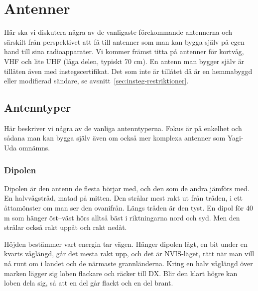 \chapter{Antenner}
\label{sec:antenner}

Här ska vi diskutera några av de vanligaste förekommande antennerna
och särskilt från perspektivet att få till antenner som man kan bygga
själv på egen hand till sina radioapparater. Vi kommer främst titta på
antenner för kortvåg, VHF och lite UHF (låga delen, typiskt 70 cm).
En antenn man bygger själv är tillåten även med instegscertifikat.
Det som inte är tillåtet då är en hemmabyggd eller modifierad sändare,
se avsnitt~\ref{sec:insteg-restriktioner}.

\vfill
\minitoc
\clearpage

\section{Antenntyper}

Här beskriver vi några av de vanliga antenntyperna. Fokus är på
enkelhet och sådana man kan bygga själv även om också mer komplexa
antenner som Yagi-Uda omnämns.

\subsection{Dipolen}

Dipolen är den antenn de flesta börjar med, och den som de andra
jämförs med. En halvvågstråd, matad på mitten. Den strålar mest rakt
ut från tråden, i ett åttamönster om man ser den ovanifrån. Längs
tråden är den tyst. En dipol för 40\,m som hänger öst--väst hörs
alltså bäst i riktningarna nord och syd. Men den strålar också rakt
uppåt och rakt nedåt.

Höjden bestämmer vart energin tar vägen. Hänger dipolen lågt, en bit
under en kvarts våglängd, går det mesta rakt upp, och det är
NVIS-läget, rätt när man vill nå runt om i landet och de närmaste
grannländerna. Kring en halv våglängd över marken lägger sig loben
flackare och räcker till DX. Blir den klart högre kan loben dela sig,
så att en del går flackt och en del brant.

